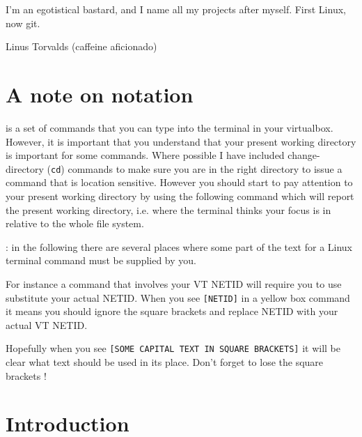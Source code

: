 
\epigraph{I'm an egotistical bastard, and I name all my projects after myself. First Linux, now git.}{Linus Torvalds (caffeine aficionado)}

\minitoc

\section{A note on notation}

 is a set of commands that you can type into the terminal in your virtualbox. However, it is important that you understand that your present working directory is important for some commands. Where possible I have included change-directory (\verb|cd|) commands to make sure you are in the right directory to issue a command that is location sensitive. However you should start to pay attention to your present working directory by using the following command 
\noindent which will report the present working directory, i.e. where the terminal thinks your focus is in relative to the whole file system.

\vspace{8pt}: in the following there are several places where some part of the text for a Linux terminal command must be supplied by you. 

For instance a command that involves your VT NETID will require you to use substitute your actual NETID. When you see \texttt{[NETID]} in a yellow box command it means you should ignore the square brackets and replace NETID with your actual VT NETID. 

Hopefully when you see \texttt{[SOME CAPITAL TEXT IN SQUARE BRACKETS]} it will be clear what text should be used in its place. Don't forget to lose the square brackets !

\section{Introduction}

